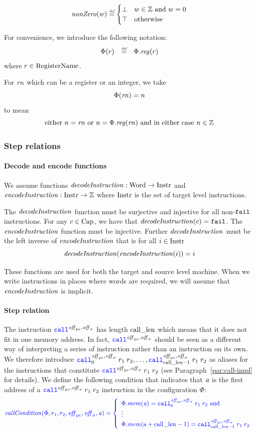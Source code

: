 \documentclass[a4paper]{article}
\begin{document}
\[
  \nonZero{w} \defeq
  \begin{cases}
    \bot & w \in \ints \tand w = 0 \\
    \top & \totherwise
  \end{cases}
\]


For convenience, we introduce the following notation:
\[
  \begin{array}{rcl}
    \Phi(r) & \defeq & \Phi.\reg(r)
  \end{array}
\]
where $r\in \mathrm{RegisterName}$.

For $\mathit{rn}$ which can be a register or an integer, we take
\[
  \Phi(\mathit{rn}) = n
\]
to mean
\[
  \text{either $n = \rn$ or $n = \Phi.\reg(\rn)$ and in either case $n \in \ints$}
\]


\subsubsection{Step relations}
\paragraph{Decode and encode functions}
We assume functions $\decInstr{} : \Word \fun \Instr$ and $\encInstr{} : \Instr \fun \ints$ where $\mathrm{Instr}$ is the set of target level instructions.

The $\decInstr{}$ function must be surjective and injective for all non-$\texttt{{\color{black} fail}}$ instructions.
For any $c \in \mathrm{Cap}$, we have that $\decInstr{c} = \tfail$.
The $\encInstr{}$ function must be injective.
Further $\decInstr{}$ must be the left inverse of $\encInstr{}$ that is for all $i \in \mathrm{Instr}$
\[
  \decInstr{}(\encInstr{i}) = i
\]

These functions are used for both the target and source level machine. When we write instructions in places where words are required, we will assume that $\encInstr{}$ is implicit.

\paragraph{Step relation}
The instruction $\scall{\offpc,\offsigma}{}{}$ has length $\mathrm{call\_len}$ which means that it does not fit in one memory address. In fact, $\scall{\offpc,\offsigma}{}{}$ should be seen as a different way of interpreting a series of instruction rather than an instruction on its own. We therefore introduce $\scall[0]{\offpc,\offsigma}{r_1}{r_2},\dots,\scall[\calllen-1]{\offpc,\offsigma}{r_1}{r_2}$ as aliases for the instructions that constitute $\scall{\offpc,\offsigma}{r_1}{r_2}$ (see Paragraph~\ref{par:call-impl} for details). We define the following condition that indicates that $\mathit{a}$ is the first address of a $\scall{\offpc,\offsigma}{r_1}{r_2}$ instruction in the configuration $\Phi$:
\[
  \sourcecolor\left.
    \callCond{\Phi,r_1,r_2,\offpc,\offsigma,\aaddr} = \left\{
      \begin{array}{l}
        \Phi.\mem(\aaddr) = \scall[0]{\offpc,\offsigma}{r_1}{r_2} \tand\\
        \vdots \\
        \Phi.\mem(\addr+\calllen-1) = \scall[\calllen-1]{\offpc,\offsigma}{r_1}{r_2}
      \end{array}
      \right.
  \right.
\]
\end{document}
